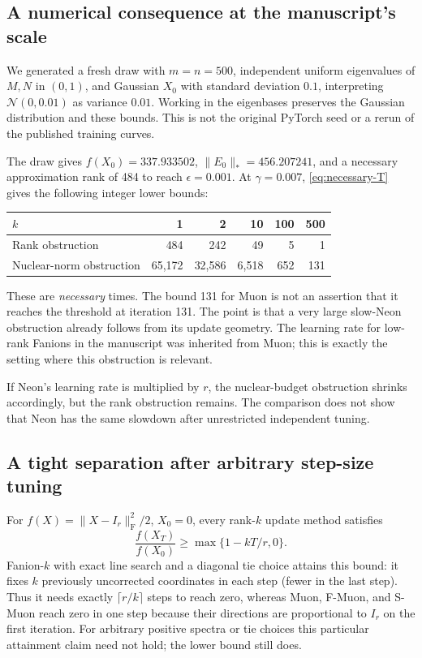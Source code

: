 \documentclass[11pt]{article}
\newcommand{\F}[1]{\lVert #1\rVert_{\mathrm F}}
\newcommand{\nuc}[1]{\lVert #1\rVert_*}
\begin{document}
\subsection{A numerical consequence at the manuscript's scale}

We generated a fresh draw with $m=n=500$, independent uniform eigenvalues of
$M,N$ in $(0,1)$, and Gaussian $X_0$ with standard deviation $0.1$, interpreting
$\mathcal N(0,0.01)$ as variance $0.01$. Working in the eigenbases preserves
the Gaussian distribution and these bounds. This is not the original
PyTorch seed or a rerun of the published training curves.

The draw gives $f(X_0)=337.933502$, $\nuc{E_0}=456.207241$, and a necessary
approximation rank of 484 to reach $\epsilon=0.001$. At $\gamma=0.007$,
\eqref{eq:necessary-T} gives the following integer lower bounds:
\begin{center}
\begin{tabular}{lrrrrr}\toprule
$k$ & 1 & 2 & 10 & 100 & 500\\\midrule
Rank obstruction & 484 & 242 & 49 & 5 & 1\\
Nuclear-norm obstruction & 65,172 & 32,586 & 6,518 & 652 & 131\\\bottomrule
\end{tabular}
\end{center}
These are \emph{necessary} times. The bound 131 for Muon is not an assertion
that it reaches the threshold at iteration 131. The point is that a very
large slow-Neon obstruction already follows from its update geometry. The
learning rate for low-rank Fanions in the manuscript was inherited from
Muon; this is exactly the setting where this obstruction is relevant.

If Neon's learning rate is multiplied by $r$, the nuclear-budget obstruction
shrinks accordingly, but the rank obstruction remains. The comparison does
not show that Neon has the same slowdown after unrestricted independent
tuning.

\subsection{A tight separation after arbitrary step-size tuning}

For $f(X)=\F{X-I_r}^2/2$, $X_0=0$, every rank-$k$ update method satisfies
\[
 \frac{f(X_T)}{f(X_0)}\geq\max\{1-kT/r,0\}.
\]
Fanion-$k$ with exact line search and a diagonal tie choice attains this bound:
it fixes $k$ previously uncorrected coordinates in each step (fewer in the
last step). Thus it needs exactly $\lceil r/k\rceil$ steps to reach zero,
whereas Muon, F-Muon, and S-Muon reach zero in one step because their
directions are proportional to $I_r$ on the first iteration.
For arbitrary positive spectra or tie choices this particular attainment
claim need not hold; the lower bound still does.
\end{document}
